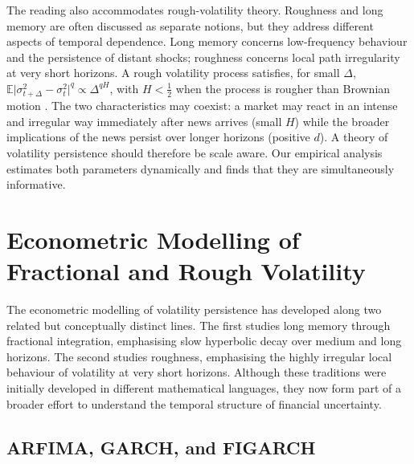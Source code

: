 \documentclass[11pt,a4paper]{article}
\newcommand{\E}{\mathbb{E}}
\begin{document}
The reading also accommodates rough-volatility theory. Roughness and long
memory are often discussed as separate notions, but they address different
aspects of temporal dependence. Long memory concerns low-frequency
behaviour and the persistence of distant shocks; roughness concerns local
path irregularity at very short horizons. A rough volatility process
satisfies, for small $\Delta$,
$\E\bigl|\sigma^2_{t+\Delta}-\sigma^2_t\bigr|^q \propto \Delta^{qH}$,
with $H<\tfrac12$ when the process is rougher than Brownian motion
\citep{gatheral2018volatility}. The two characteristics may coexist:
a market may react in an intense and irregular way immediately after news
arrives (small $H$) while the broader implications of the news persist
over longer horizons (positive $d$). A theory of volatility persistence
should therefore be scale aware. Our empirical analysis estimates both
parameters dynamically and finds that they are simultaneously informative.

\section{Econometric Modelling of Fractional and Rough Volatility}
\label{sec:econometrics}

The econometric modelling of volatility persistence has developed along
two related but conceptually distinct lines. The first studies long memory
through fractional integration, emphasising slow hyperbolic decay over
medium and long horizons. The second studies roughness, emphasising the
highly irregular local behaviour of volatility at very short horizons.
Although these traditions were initially developed in different
mathematical languages, they now form part of a broader effort to
understand the temporal structure of financial uncertainty.

\subsection{ARFIMA, GARCH, and FIGARCH}
\end{document}
